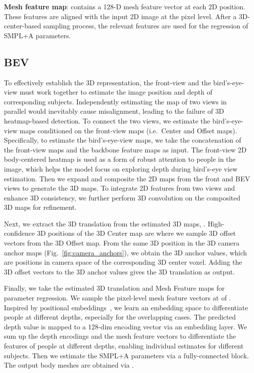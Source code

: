 \documentclass[10pt,twocolumn,letterpaper]{article}
\begin{document}
\textbf{Mesh feature map}:
 contains a 128-D mesh feature vector at each 2D position.
These features are aligned with the input 2D image at the pixel level. 
After a 3D-center-based sampling process, the relevant features are used for the regression of SMPL+A parameters.


\subsection{BEV}
To effectively establish the 3D representation, the front-view and the bird's-eye-view must work together to estimate the image position and depth of corresponding subjects.
Independently estimating the map of two views in parallel would inevitably cause misalignment, leading to the failure of 3D heatmap-based detection. 
To connect the two views, we estimate the bird's-eye-view maps conditioned on the front-view maps (i.e.~Center and Offset maps).
Specifically, to estimate the bird's-eye-view maps, we take the concatenation of the front-view maps and the backbone feature maps as input.
The front-view 2D body-centered heatmap is used as a form of robust attention to people in the image, which helps the model focus on exploring depth during bird's-eye view estimation.
Then we expand and composite the 2D maps from the front and BEV views to generate the 3D maps.
To integrate 2D features from two views and enhance 3D consistency, we further perform 3D convolution on the composited 3D maps for refinement.

Next, we extract the 3D translation from the estimated 3D maps, .
High-confidence 3D positions of the 3D Center map are where we sample 3D offset vectors from the 3D Offset map. 
From the same 3D position in the 3D camera anchor maps (Fig.~\ref{fig:camera_anchors}), we obtain the 3D anchor values, which are positions in camera space of the corresponding 3D center voxel. 
Adding the 3D offset vectors to the 3D anchor values gives the 3D translation as output. 

Finally, we take the estimated 3D translation  and Mesh Feature maps  for parameter regression.
We sample the pixel-level mesh feature vectors at  of . 
Inspired by positional embeddings~\cite{transformer}, we learn an embedding space to differentiate people at different depths, especially for the overlapping cases.
The predicted depth value  is mapped to a 128-dim encoding vector via an embedding layer.
We sum up the depth encodings and the mesh feature vectors to differentiate the features of people at different depths, enabling individual estimates for different subjects.
Then we estimate the SMPL+A parameters  via a fully-connected block.
The output body meshes are obtained via . 
\end{document}

